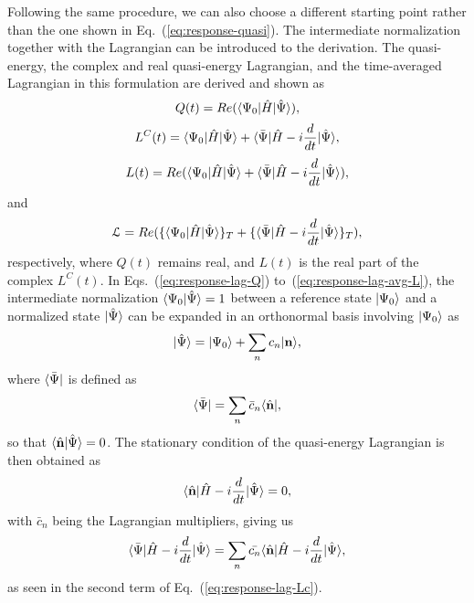 Following the same procedure, we can also choose a different starting point rather than the one shown in Eq.~(\ref{eq:response-quasi}). The intermediate normalization together with the Lagrangian can be introduced to the derivation. The quasi-energy, the complex and real quasi-energy Lagrangian, and the time-averaged Lagrangian in this formulation are derived and shown as
\begin{equation}
Q(t)  = Re(\langle\Psi_{0} |\hat{H}| \hat{\Psi} \rangle),
\label{eq:response-lag-Q}
\end{equation}
\begin{equation}
L^{C}(t)  = \langle\Psi_{0} |\hat{H}| \hat{\Psi} \rangle + \langle\bar{\Psi} |\hat{H} - i\frac{d}{dt}| \hat{\Psi} \rangle,
\label{eq:response-lag-Lc}
\end{equation}
\begin{equation}
L(t)  = Re(\langle\Psi_{0} |\hat{H}| \hat{\Psi} \rangle + \langle\bar{\Psi} |\hat{H} - i\frac{d}{dt}| \hat{\Psi} \rangle),
\label{eq:response-lag-L}
\end{equation}
and
\begin{equation}
\mathcal{L}  = Re(\{\langle\Psi_{0} |\hat{H}| \hat{\Psi} \rangle\}_{T} + \{\langle\bar{\Psi} |\hat{H} - i\frac{d}{dt}| \hat{\Psi} \rangle\}_{T}),
\label{eq:response-lag-avg-L}
\end{equation}
respectively, where $Q(t)$ remains real, and $L(t)$ is the real part of the complex $L^{C}(t)$. In Eqs.~(\ref{eq:response-lag-Q}) to~(\ref{eq:response-lag-avg-L}), the intermediate normalization $\langle\Psi_{0} |\hat{\Psi}\rangle=1$ between a reference state $| \Psi_{0} \rangle$ and a normalized state $| \hat{\Psi} \rangle$ can be expanded in an orthonormal basis involving $| \Psi_{0} \rangle$ as
\begin{equation}
| \hat{\Psi} \rangle = | \Psi_{0} \rangle + \sum_{n}c_{n}| \textbf{n} \rangle,
\label{eq:response-c}
\end{equation}
where $\langle\bar{\Psi} |$ is defined as 
\begin{equation}
\langle\bar{\Psi} |=\sum_{n}\bar{c}_{n}\langle\hat{\textbf{n}} |,
\label{eq:response-cbar}
\end{equation}
so that $\langle\hat{\textbf{n}} |\hat{\Psi}\rangle=0$. The stationary condition of the quasi-energy Lagrangian is then obtained as
\begin{equation}
\langle\hat{\textbf{n}} |\hat{H}-i\frac{d}{dt}| \hat{\Psi} \rangle=0,
\end{equation}
with $\bar{c}_{n}$ being the Lagrangian multipliers, giving us 
\begin{equation}
\langle\bar{\Psi} |\hat{H} - i\frac{d}{dt}| \hat{\Psi} \rangle = \sum_{n}\bar{c_{n}}\langle\hat{\textbf{n}} |\hat{H}-i\frac{d}{dt}| \hat{\Psi} \rangle,
\end{equation}
as seen in the second term of Eq.~(\ref{eq:response-lag-Lc}).

